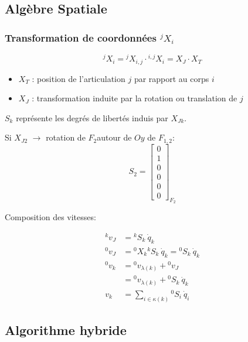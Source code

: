 \documentclass[10pt]{beamer}
\begin{document}
\subsection{Algèbre Spatiale}

\hypertarget{app_algSpat}{}

\begin{frame}[allowframebreaks]
  \frametitle{Transformation de coordonnées $^jX_i$}
  
  
  \framebreak
  
  \begin{block}{}
  \begin{equation*}
  ^jX_i = {^jX_{i,j}} \cdot {^{i,j}X_i} = X_J \cdot X_T
  \end{equation*}
  
  \begin{itemize}
  \item $X_T$ : position de l'articulation $j$ par rapport au corps $i$
  \item $X_J$ : transformation induite par la rotation ou translation de $j$
  \end{itemize}
  \end{block}
  
  \bigskip
  $S_k$ représente les degrés de libertés induis par $X_{Jk}$.
  
  Si $X_{J2}$ $\rightarrow$ rotation de $F_2 $autour de $Oy$ de $F_{1,2}$:
  \begin{equation*}
  S_2 = \begin{bmatrix}
  0 \\ 1 \\ 0 \\ 0 \\ 0 \\ 0
  \end{bmatrix}_{F_2}
  \end{equation*}
  
  \framebreak
  
  Composition des vitesses:
  
	\begin{align*}
	{^kv_J} &= {^kS_k} \: \dot{q}_k \\
	{^0v_J} &= {^0X_k} {^kS_k} \: \dot{q}_k = {^0S_k} \: \dot{q}_k \\
	{^0v_k} &= {^0v_{\lambda(k)}} + {^0v_{J}} \\
	&= {^0v_{\lambda(k)}} + {^0S_k} \: \dot{q}_k \\
	 v_k &= \sum_{i \in \kappa(k)} {^0S_i} \: \dot{q}_i
	\end{align*}
    
\end{frame}

\subsection{Algorithme hybride}

\begin{frame}
  \frametitle{}
  
  
\end{frame}


\end{document}
